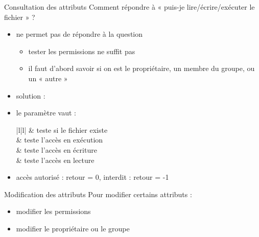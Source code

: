 \begin {frame} {Consultation des attributs}
    Comment répondre à « puis-je lire/écrire/exécuter le fichier » ?

    \begin {itemize}
	\item {} ne permet pas de répondre à la question
	    \begin {itemize}
		\item tester les permissions ne suffit pas
		\item il faut d'abord savoir si on est le propriétaire,
		    un membre du groupe, ou un « autre »
	    \end {itemize}

	\item solution :


	\item le paramètre  vaut :

	    \ctableau {\fC} {|l|l|} {
		 & teste si le fichier existe \\
		 & teste l'accès en exécution \\
		 & teste l'accès en écriture \\
		 & teste l'accès en lecture \\
	    }

	\item accès autorisé : retour = 0, interdit : retour = -1

    \end {itemize}
\end {frame}

\begin {frame} {Modification des attributs}
    Pour modifier certains attributs :
    \begin {itemize}
	\item modifier les permissions

	\item modifier le propriétaire ou le groupe
    \end {itemize}
\end {frame}

